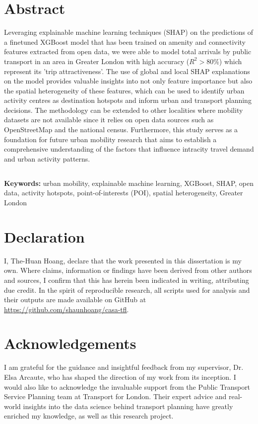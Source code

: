 \chapter*{Abstract}
Leveraging explainable machine learning techniques (SHAP) on the predictions of a finetuned XGBoost model that has been trained on amenity and connectivity features extracted from open data, we were able to model total arrivals by public transport in an area in Greater London with high accuracy ($R^2>80\%$) which represent its 'trip attractiveness'. The use of global and local SHAP explanations on the model provides valuable insights into not only feature importance but also the spatial heterogeneity of these features, which can be used to identify urban activity centres as destination hotspots and inform urban and transport planning decisions. The methodology can be extended to other localities where mobility datasets are not available since it relies on open data sources such as OpenStreetMap and the national census. Furthermore, this study serves as a foundation for future urban mobility research that aims to establish a comprehensive understanding of the factors that influence intracity travel demand and urban activity patterns.

\section*{}
\textbf{Keywords:} urban mobility, explainable machine learning, XGBoost, SHAP, open data, activity hotspots, point-of-interests (POI), spatial heterogeneity, Greater London

\chapter*{Declaration}
I, The-Huan Hoang, declare that the work presented in this dissertation is my own. Where claims, information or findings have been derived from other authors and sources, I confirm that this has herein been indicated in writing, attributing due credit. In the spirit of reproducible research, all scripts used for analysis and their outputs are made available on GitHub at \url{https://github.com/shaunhoang/casa-tfl}. 

\chapter*{Acknowledgements}
I am grateful for the guidance and insightful feedback from my supervisor, Dr. Elsa Arcaute, who has shaped the direction of my work from its inception. I would also like to acknowledge the invaluable support from the Public Transport Service Planning team at Transport for London. Their expert advice and real-world insights into the data science behind transport planning have greatly enriched my knowledge, as well as this research project.

\tableofcontents

\listoffigures

\listoftables